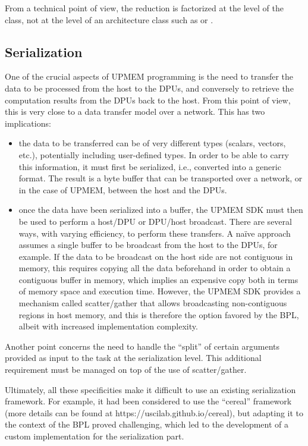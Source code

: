From a technical point of view, the reduction is factorized at the level of the  class, not at the level of an architecture class such as  or .

\subsection{Serialization}

One of the crucial aspects of UPMEM programming is the need to transfer the data to be processed from the host to the DPUs, and conversely to retrieve the computation results from the DPUs back to the host. From this point of view, this is very close to a data transfer model over a network. This has two implications:

\begin{itemize}

\item the data to be transferred can be of very different types (scalars, vectors, etc.), potentially including user-defined types. In order to be able to carry this information, it must first be serialized, i.e.,  converted into a generic format. The result is a byte buffer that can be transported over a network,  or in the case of UPMEM, between the host and the DPUs.

\item once the data have been serialized into a buffer, the UPMEM SDK must then be used to perform a host/DPU or DPU/host broadcast. There are several ways, with varying efficiency, to perform these transfers. A naïve approach assumes a single buffer to be broadcast from the host to the DPUs, for example. If the data to be broadcast on the host side are not contiguous in memory, this requires copying all the data beforehand in order to obtain a contiguous buffer in memory, which implies an expensive copy both in terms of memory space and execution time. However, the UPMEM SDK provides a mechanism called scatter/gather that allows broadcasting non-contiguous regions in host memory, and this is therefore the option favored by the BPL, albeit with increased implementation complexity.

\end{itemize}

Another point concerns the need to handle the “split” of certain arguments provided as input to the task at the  serialization level. This additional requirement must be managed on top of the use of scatter/gather.

Ultimately, all these specificities make it difficult to use an existing serialization framework.  For example, it had been considered to use the “cereal” framework  (more details can be found at https://uscilab.github.io/cereal), but adapting it to the context of the BPL proved challenging, 
which led to the development of a custom implementation for the serialization part.


